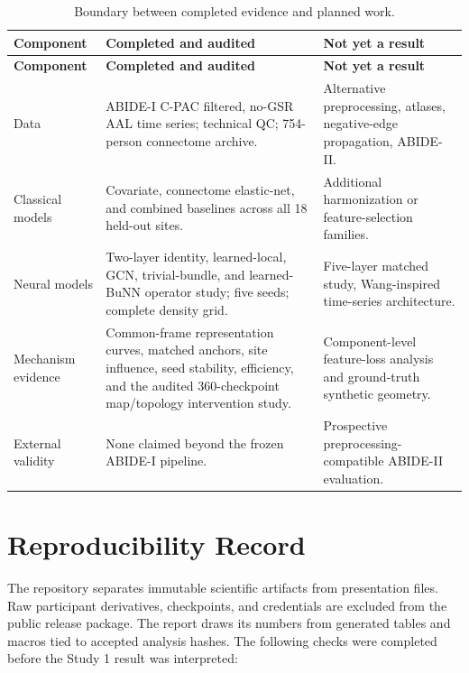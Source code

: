 \documentclass[11pt,a4paper]{article}
\begin{document}
\begin{longtable}{@{}p{3.2cm}p{5.6cm}p{5.5cm}@{}}
\caption{Boundary between completed evidence and planned work.}\label{tab:status}\\
\toprule
\textbf{Component} & \textbf{Completed and audited} & \textbf{Not yet a result} \\
\midrule
\endfirsthead
\toprule
\textbf{Component} & \textbf{Completed and audited} & \textbf{Not yet a result} \\
\midrule
\endhead
Data & ABIDE-I C-PAC filtered, no-GSR AAL time series; technical QC; 754-person connectome archive. & Alternative preprocessing, atlases, negative-edge propagation, ABIDE-II. \\
Classical models & Covariate, connectome elastic-net, and combined baselines across all 18 held-out sites. & Additional harmonization or feature-selection families. \\
Neural models & Two-layer identity, learned-local, GCN, trivial-bundle, and learned-BuNN operator study; five seeds; complete density grid. & Five-layer matched study, Wang-inspired time-series architecture. \\
Mechanism evidence & Common-frame representation curves, matched anchors, site influence, seed stability, efficiency, and the audited 360-checkpoint map/topology intervention study. & Component-level feature-loss analysis and ground-truth synthetic geometry. \\
External validity & None claimed beyond the frozen ABIDE-I pipeline. & Prospective preprocessing-compatible ABIDE-II evaluation. \\
\bottomrule
\end{longtable}

\clearpage
\appendix
\section{Reproducibility Record}

The repository separates immutable scientific artifacts from presentation
files. Raw participant derivatives, checkpoints, and credentials are excluded
from the public release package. The report draws its numbers from generated
tables and macros tied to accepted analysis hashes. The following checks were
completed before the Study 1 result was interpreted:
\end{document}
